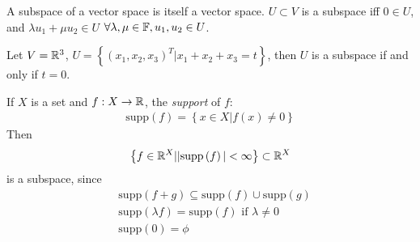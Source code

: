 \documentclass[a4paper]{article}
\begin{document}
\begin{rem}
A subspace of a vector space is itself a vector space. $U\subset V$ is a subspace iff $0\in U$, and $\lambda u_1+\mu u_2 \in U$ $\forall \lambda,\mu \in \mathbb{F}, u_1,u_2\in U$.
\end{rem}

\begin{eg}
Let $V=\mathbb{R}^3$, $U=\left\{\left(x_1,x_2,x_3\right)^T |x_1+x_2+x_3=t\right\}$, then $U$ is a subspace if and only if $t=0$.
\end{eg}

\begin{eg}
If $X$ is a set and $f:X\to \mathbb{R}$, the \emph{support} of $f$:
\begin{equation*}
\begin{aligned}
\text{supp} \left(f\right) = \left\{x\in X |f\left(x\right)\neq 0\right\}
\end{aligned}
\end{equation*}
Then
\begin{equation*}
\begin{aligned}
\left\{f\in \mathbb{R}^X | |\text{supp} \left(f\right)| < \infty\right\} \subset \mathbb{R}^X
\end{aligned}
\end{equation*}
is a subspace, since
\begin{equation*}
\begin{aligned}
&\text{supp} \left(f+g\right) \subseteq\text{supp}\left(f\right) \cup \text{supp}\left(g\right)\\
&\text{supp} \left(\lambda f\right) = \text{supp}\left(f\right) \text{ if } \lambda \neq 0\\
&\text{supp}\left(0\right)=\phi
\end{aligned}
\end{equation*}
\end{eg}
\end{document}
